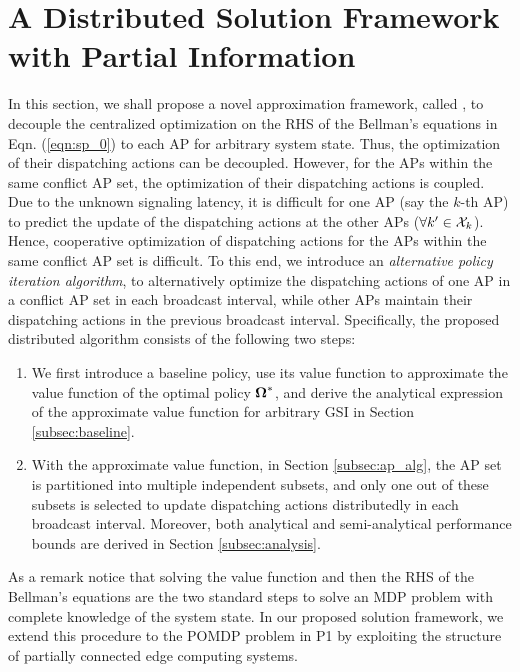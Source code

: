 \section{A Distributed Solution Framework with Partial Information}
\label{sec:algorithm}
In this section, we shall propose a novel approximation framework, called \algname, to decouple the centralized optimization on the RHS of the Bellman's equations in Eqn. (\ref{eqn:sp_0}) to each AP for arbitrary system state.
Thus, the optimization of their dispatching actions can be decoupled.
However, for the APs within the same conflict AP set, the optimization of their dispatching actions is coupled.
Due to the unknown signaling latency, it is difficult for one AP (say the $k$-th AP) to predict the update of the dispatching actions at the other APs ($\forall k' \in\mathcal{X}_{k}$).
Hence, cooperative optimization of dispatching actions for the APs within the same conflict AP set is difficult. %
To this end, we introduce an \emph{alternative policy iteration algorithm}, to alternatively optimize the dispatching actions of one AP in a conflict AP set in each broadcast interval, while other APs maintain their dispatching actions in the previous broadcast interval.
Specifically, the proposed distributed algorithm consists of the following two steps:
\begin{enumerate}
    \item We first introduce a baseline policy, use its value function to approximate the value function of the optimal policy $\boldsymbol{\Omega}^*$, and derive the analytical expression of the approximate value function for arbitrary GSI in Section \ref{subsec:baseline}.
    \item With the approximate value function, in Section \ref{subsec:ap_alg}, the AP set is partitioned into multiple independent subsets,
    and only one out of these subsets is selected to update dispatching actions distributedly in each broadcast interval.
    Moreover, both analytical and semi-analytical performance bounds are derived in Section \ref{subsec:analysis}.
\end{enumerate}
As a remark notice that solving the value function and then the RHS of the Bellman's equations are the two standard steps to solve an MDP problem with complete knowledge of the system state.
In our proposed solution framework, we extend this procedure to the POMDP problem in P1 by exploiting the structure of partially connected edge computing systems.

